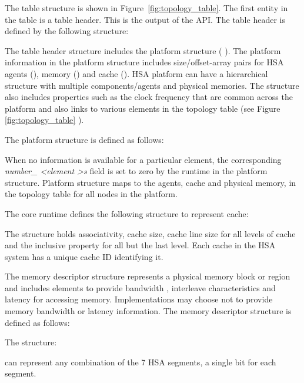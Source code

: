 The table structure is shown in Figure~\ref{fig:topology_table}.
The first entity in the table is a table header. This is the output
of the  API.
The table header is defined by the following structure:


The table header structure includes the platform structure (
).  The platform information in the platform
structure includes size/offset-array pairs for HSA agents
(), memory () and
cache ().  
HSA platform can have a hierarchical structure with multiple
components/agents and physical memories.  The
 structure also includes properties such as
the clock frequency that are common across the platform and also
links to various elements in the topology table (see Figure
\ref{fig:topology_table} ).

The platform structure is defined as follows:



When no information is available for a particular element, the
corresponding {\itshape number\_ \textless element \textgreater s}
field is set to zero by the runtime in the platform structure.
Platform structure maps to the agents, cache and physical memory,
\DIFdelbegin {}%
\DIFdelend in the topology table for all nodes in the platform. 

The core runtime defines the following structure to represent cache:

The structure holds associativity, cache size, cache line size for
all levels of cache and the inclusive property for all but the
last level. Each cache in the HSA system has a unique cache ID
identifying it.

The memory descriptor structure represents a physical memory block
or region and includes elements to provide bandwidth \DIFaddbegin {} \DIFaddend , interleave
characteristics and latency for accessing memory. Implementations
may choose not to provide memory bandwidth or latency information.
The memory descriptor structure is defined as follows:

 

The structure: 
 
can represent any combination of the 7 HSA segments, a single
bit for each segment. 

